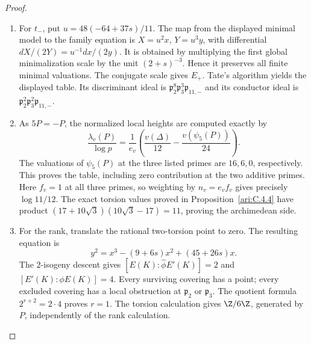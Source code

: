 \begin{proof}
\begin{enumerate}[label=\arabic*.,leftmargin=*]
\item For $t_-$, put $u=48(-64+37s)/11$.
The map from the displayed minimal model to the family equation is
$X=u^2x$, $Y=u^3y$, with differential
$dX/(2Y)=u^{-1}dx/(2y)$.
It is obtained by multiplying the first global minimalization
scale by the unit $(2+s)^{-3}$. Hence it preserves all finite
minimal valuations. The conjugate scale gives $E_+$.
Tate's algorithm yields the displayed table. Its discriminant
ideal is
$\mathfrak p_2^8\mathfrak p_3^3\mathfrak p_{11,-}$ and its
conductor ideal is
$\mathfrak p_2^2\mathfrak p_3^2\mathfrak p_{11,-}$.

\item As $5P=-P$, the normalized local heights are computed exactly by
\[
 \frac{\lambda_v(P)}{\log p}
 =\frac1{e_v}\left(\frac{v(\Delta)}{12}
                         -\frac{v(\psi_5(P))}{24}\right).
\]
The valuations of $\psi_5(P)$ at the three listed primes are
$16,6,0$, respectively. This proves the table, including zero
contribution at the two additive primes. Here $f_v=1$ at all
three primes, so weighting by $n_v=e_vf_v$ gives precisely
$\log11/12$. The exact torsion values proved in Proposition~\ref{ari:C.4.4} have product
$(17+10\sqrt3)(10\sqrt3-17)=11$, proving the archimedean side.

\item For the rank, translate the rational two-torsion point to zero.
The resulting equation is
\[
 y^2=x^3-(9+6s)x^2+(45+26s)x.
\]
The $2$-isogeny descent gives
$[E(K):\widehat\phi E'(K)]=2$ and
$[E'(K):\phi E(K)]=4$. Every surviving covering has a
point; every excluded covering has a local
obstruction at $\mathfrak p_2$ or $\mathfrak p_3$.
The quotient formula $2^{r+2}=2\cdot4$ proves $r=1$.
The torsion calculation
gives $\Z/6\Z$, generated by $P$, independently of the rank
calculation.
\end{enumerate}
\end{proof}